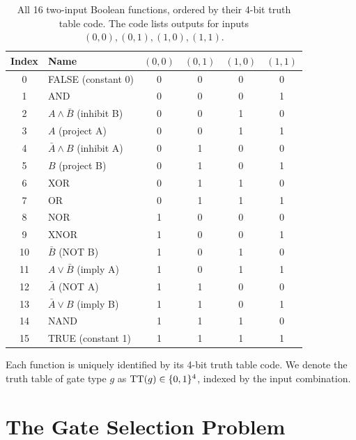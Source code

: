 \begin{table}[htbp]
\centering
\caption{All 16 two-input Boolean functions, ordered by their 4-bit
  truth table code. The code lists outputs for inputs $(0,0),
  (0,1), (1,0), (1,1)$.}
\label{tab:all-16}
\begin{tabular}{@{}clcccc@{}}
  \toprule
  \textbf{Index} & \textbf{Name} & $(0,0)$ & $(0,1)$ & $(1,0)$ & $(1,1)$ \\
  \midrule
  0  & FALSE (constant 0) & 0 & 0 & 0 & 0 \\
  1  & AND              & 0 & 0 & 0 & 1 \\
  2  & $A \wedge \bar{B}$ (inhibit B) & 0 & 0 & 1 & 0 \\
  3  & $A$ (project A)    & 0 & 0 & 1 & 1 \\
  4  & $\bar{A} \wedge B$ (inhibit A) & 0 & 1 & 0 & 0 \\
  5  & $B$ (project B)    & 0 & 1 & 0 & 1 \\
  6  & XOR              & 0 & 1 & 1 & 0 \\
  7  & OR               & 0 & 1 & 1 & 1 \\
  8  & NOR              & 1 & 0 & 0 & 0 \\
  9  & XNOR             & 1 & 0 & 0 & 1 \\
  10 & $\bar{B}$ (NOT B)  & 1 & 0 & 1 & 0 \\
  11 & $A \vee \bar{B}$ (imply A) & 1 & 0 & 1 & 1 \\
  12 & $\bar{A}$ (NOT A)  & 1 & 1 & 0 & 0 \\
  13 & $\bar{A} \vee B$ (imply B) & 1 & 1 & 0 & 1 \\
  14 & NAND             & 1 & 1 & 1 & 0 \\
  15 & TRUE (constant 1)  & 1 & 1 & 1 & 1 \\
  \bottomrule
\end{tabular}
\end{table}

Each function is uniquely identified by its 4-bit truth table code.
We denote the truth table of gate type $g$ as $\operatorname{TT}(g) \in
\{0,1\}^4$, indexed by the input combination.


\section{The Gate Selection Problem}
\label{sec:gate-selection}

